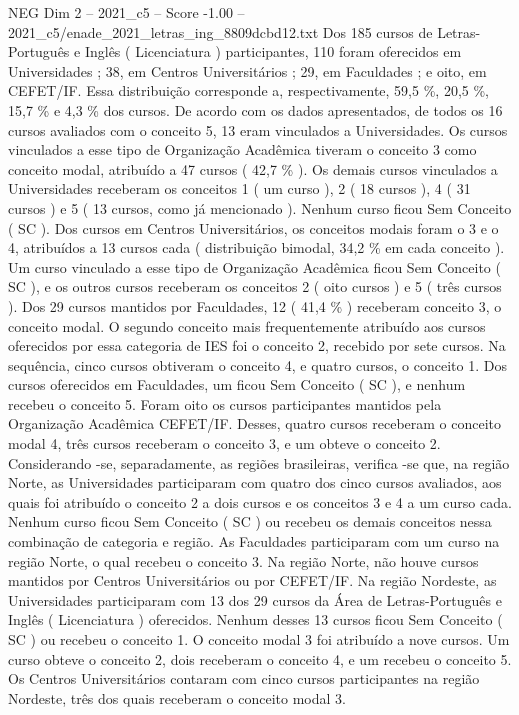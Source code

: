 \begin{textsample}{NEG Dim 2 – 2021\_c5 – Score -1.00 – 2021\_c5/enade\_2021\_letras\_ing\_8809dcbd12.txt}
Dos 185 cursos de Letras-Português e Inglês ( Licenciatura ) participantes, 110 foram oferecidos em Universidades ; 38, em Centros Universitários ; 29, em Faculdades ; e oito, em CEFET/IF.
Essa distribuição corresponde a, respectivamente, 59,5 \%, 20,5 \%, 15,7 \% e 4,3 \% dos cursos.
De acordo com os dados apresentados, de todos os 16 cursos avaliados com o conceito 5, 13 eram vinculados a Universidades.
Os cursos vinculados a esse tipo de Organização Acadêmica tiveram o conceito 3 como conceito modal, atribuído a 47 cursos ( 42,7 \% ).
Os demais cursos vinculados a Universidades receberam os conceitos 1 ( um curso ), 2 ( 18 cursos ), 4 ( 31 cursos ) e 5 ( 13 cursos, como já mencionado ).
Nenhum curso ficou Sem Conceito ( SC ).
Dos cursos em Centros Universitários, os conceitos modais foram o 3 e o 4, atribuídos a 13 cursos cada ( distribuição bimodal, 34,2 \% em cada conceito ).
Um curso vinculado a esse tipo de Organização Acadêmica ficou Sem Conceito ( SC ), e os outros cursos receberam os conceitos 2 ( oito cursos ) e 5 ( três cursos ).
Dos 29 cursos mantidos por Faculdades, 12 ( 41,4 \% ) receberam conceito 3, o conceito modal.
O segundo conceito mais frequentemente atribuído aos cursos oferecidos por essa categoria de IES foi o conceito 2, recebido por sete cursos.
Na sequência, cinco cursos obtiveram o conceito 4, e quatro cursos, o conceito 1.
Dos cursos oferecidos em Faculdades, um ficou Sem Conceito ( SC ), e nenhum recebeu o conceito 5.
Foram oito os cursos participantes mantidos pela Organização Acadêmica CEFET/IF.
Desses, quatro cursos receberam o conceito modal 4, três cursos receberam o conceito 3, e um obteve o conceito 2.
Considerando -se, separadamente, as regiões brasileiras, verifica -se que, na região Norte, as Universidades participaram com quatro dos cinco cursos avaliados, aos quais foi atribuído o conceito 2 a dois cursos e os conceitos 3 e 4 a um curso cada.
Nenhum curso ficou Sem Conceito ( SC ) ou recebeu os demais conceitos nessa combinação de categoria e região.
As Faculdades participaram com um curso na região Norte, o qual recebeu o conceito 3.
Na região Norte, não houve cursos mantidos por Centros Universitários ou por CEFET/IF.
Na região Nordeste, as Universidades participaram com 13 dos 29 cursos da Área de Letras-Português e Inglês ( Licenciatura ) oferecidos.
Nenhum desses 13 cursos ficou Sem Conceito ( SC ) ou recebeu o conceito 1.
O conceito modal 3 foi atribuído a nove cursos.
Um curso obteve o conceito 2, dois receberam o conceito 4, e um recebeu o conceito 5.
Os Centros Universitários contaram com cinco cursos participantes na região Nordeste, três dos quais receberam o conceito modal 3.

\end{textsample}
